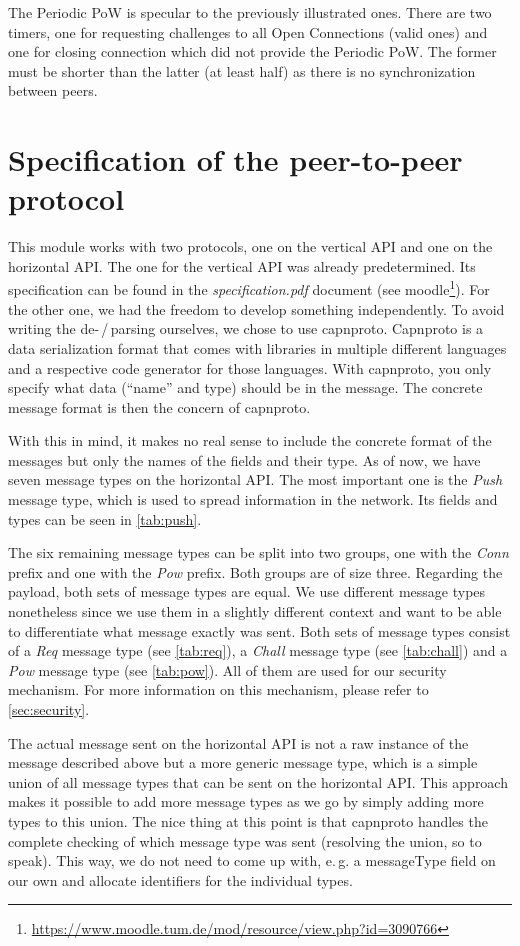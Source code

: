 \documentclass[a4paper,english,10pt,NET]{tumarticle}
\renewcommand{\eg}{\mbox{e.\,g.}\xspace} %
\begin{document}
The Periodic PoW is specular to the previously illustrated ones. There are two timers, one for requesting challenges to all Open Connections (valid ones) and one for closing connection which did not provide the Periodic PoW. The former must be shorter than the latter (at least half) as there is no synchronization between peers.  

\section{Specification of the peer-to-peer protocol} \label{sec:msgtypes}
This module works with two protocols, one on the vertical API and one on the horizontal API.
The one for the vertical API was already predetermined.
Its specification can be found in the \emph{specification.pdf} document (see moodle\footnote{\url{https://www.moodle.tum.de/mod/resource/view.php?id=3090766}}).
For the other one, we had the freedom to develop something independently.
To avoid writing the de-\,/\,parsing ourselves, we chose to use capnproto.
Capnproto is a data serialization format that comes with libraries in multiple different languages and a respective code generator for those languages.
With capnproto, you only specify what data (\enquote{name} and type) should be in the message.
The concrete message format is then the concern of capnproto.

With this in mind, it makes no real sense to include the concrete format of the messages but only the names of the fields and their type.
As of now, we have seven message types on the horizontal API.
The most important one is the \emph{Push} message type, which is used to spread information in the network.
Its fields and types can be seen in \cref{tab:push}.

The six remaining message types can be split into two groups, one with the \emph{Conn} prefix and one with the \emph{Pow} prefix.
Both groups are of size three.
Regarding the payload, both sets of message types are equal.
We use different message types nonetheless since we use them in a slightly different context and want to be able to differentiate what message exactly was sent.
Both sets of message types consist of
a \emph{Req} message type (see \cref{tab:req}),
a \emph{Chall} message type (see \cref{tab:chall}) and
a \emph{Pow} message type (see \cref{tab:pow}).
All of them are used for our security mechanism.
For more information on this mechanism, please refer to \cref{sec:security}.

The actual message sent on the horizontal API is not a raw instance of the message described above but a more generic message type, which is a simple union of all message types that can be sent on the horizontal API.
This approach makes it possible to add more message types as we go by simply adding more types to this union.
The nice thing at this point is that capnproto handles the complete checking of which message type was sent (resolving the union, so to speak).
This way, we do not need to come up with, \eg a messageType field on our own and allocate identifiers for the individual types.
\end{document}
